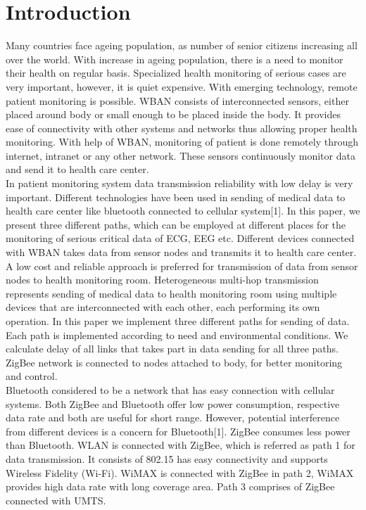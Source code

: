 \documentclass[11pt, conference, compsocconf, onecolumn]{IEEEtran}
\begin{document}
\section{Introduction}
Many countries face ageing population, as number of senior citizens increasing all over the world. With increase in ageing population, there is a need to monitor their health on regular basis. Specialized health monitoring of serious cases are very important, however, it is quiet expensive. With emerging technology, remote patient monitoring is possible. WBAN consists of interconnected sensors, either placed around body or small enough to be placed inside the body. It provides ease of connectivity with other systems and networks thus allowing proper health monitoring. With help of WBAN, monitoring of patient is done remotely through internet, intranet or any other network. These sensors continuously monitor data and send it to health care center.\\
\indent In patient monitoring system data transmission reliability with low delay is very important. Different technologies have been used in sending of medical data to health care center like bluetooth connected to cellular system[1]. In this paper, we present three different paths, which can be employed at different places for the monitoring of serious critical data of ECG, EEG etc. Different devices connected with WBAN takes data from sensor nodes and transmits it to health care center.\\
\indent A low cost and reliable approach is preferred for transmission of data from sensor nodes to health monitoring room. Heterogeneous multi-hop transmission represents sending of medical data to health monitoring room using multiple devices that are interconnected with each other, each performing its own operation. In this paper we implement three different paths for sending of data. Each path is implemented according to need and environmental conditions. We calculate delay of all links that takes part in data sending for all three paths. ZigBee network is connected to nodes attached to body, for better monitoring and control.\\
\indent Bluetooth considered to be a network that has easy connection with cellular systems. Both ZigBee and Bluetooth offer low power consumption, respective data rate and both are useful for short range. However, potential interference from different devices is a concern for Bluetooth[1]. ZigBee consumes less power than Bluetooth. WLAN is connected with ZigBee, which is referred as path 1 for data transmission. It consists of 802.15 has easy connectivity and supports Wireless Fidelity (Wi-Fi). WiMAX is connected with ZigBee in path 2, WiMAX provides high data rate with long coverage area. Path 3 comprises of ZigBee connected with UMTS.\\
\end{document}
